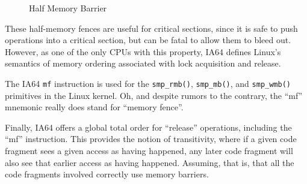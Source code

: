 \begin{figure}[tb]
\begin{center}
\end{center}
\caption{Half Memory Barrier}
\end{figure}

These half-memory fences are useful for critical sections, since
it is safe to push operations into a critical section, but can be
fatal to allow them to bleed out.
However, as one of the only CPUs with this property, IA64 defines
Linux's semantics of memory ordering associated with lock acquisition
and release.

The IA64 {\tt mf} instruction is used for the {\tt smp\_rmb()},
{\tt smp\_mb()}, and {\tt smp\_wmb()} primitives in the Linux kernel.
Oh, and despite rumors to the contrary, the ``mf'' mnemonic really
does stand for ``memory fence''.

Finally, IA64 offers a global total order for ``release'' operations,
including the ``mf'' instruction.
This provides the notion of transitivity, where if a given code fragment
sees a given access as having happened, any later code fragment will
also see that earlier access as having happened.
Assuming, that is, that all the code fragments involved correctly use
memory barriers.

